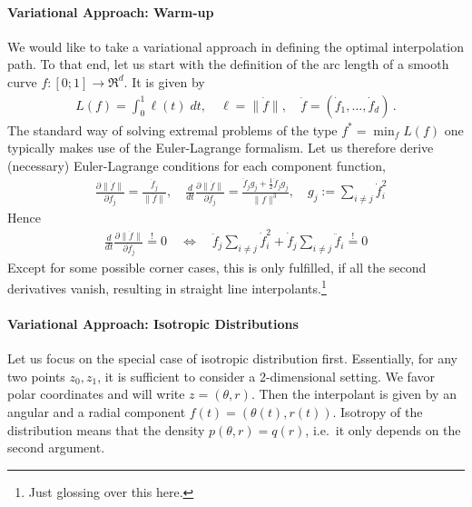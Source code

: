 \documentclass{article}
\begin{document}
\paragraph{Variational Approach: Warm-up}

We would like to take a variational approach in defining the optimal interpolation path. To that end, let us start with the definition of the arc length of a smooth curve $f: [0;1] \to \Re^d$. It is given by 
\begin{align}
L(f) = \int_0^1\ell(t) \; dt, \quad \ell = \| \dot f\|, \quad \dot f = (\dot f_1, \dots, \dot f_d) \,.
\end{align} 
The standard way of solving extremal problems of the type $f^* = \min_f L(f)$ one typically makes use of the Euler-Lagrange formalism. Let us therefore derive (necessary) Euler-Lagrange conditions for each component function,
\begin{align}
& 
\frac{\partial \| \dot f\|}{\partial \dot f_j}  = \frac{\dot f_j}{\| \dot f\|}, \quad 
\frac{d}{dt} \frac{\partial \| \dot f\|}{\partial \dot f_j} = \frac{\ddot f_j g_j + \frac 12 \dot f_j \dot g_j}{\| \dot f\|^3}, \quad g_j := \sum_{i \neq j} \dot f_i^2
\end{align} 
Hence 
\begin{align}
\frac{d}{dt} \frac{\partial \| \dot f\|}{\partial \dot f_j} \stackrel != 0  \quad \iff  \quad 
\ddot f_j  \sum_{i \neq j} \dot f_i^2 + \dot f_j \sum_{i \neq j}  \ddot f_i \stackrel !=0 
\end{align}
Except for some possible corner cases, this is only fulfilled, if all the second derivatives vanish, resulting in straight line interpolants.\footnote{Just glossing over this here.}

\paragraph{Variational Approach: Isotropic Distributions}

Let us focus on the special case of isotropic distribution first. Essentially, for any two points $z_0, z_1$, it is sufficient to consider a 2-dimensional setting. We favor polar coordinates and will write $z = (\theta, r)$. Then the interpolant is given by  an angular and a radial component  $f(t) = (\theta(t), r(t))$. Isotropy of the distribution means that the density $p(\theta, r)= q(r)$, i.e.~it only depends on the second argument. 
\end{document}
